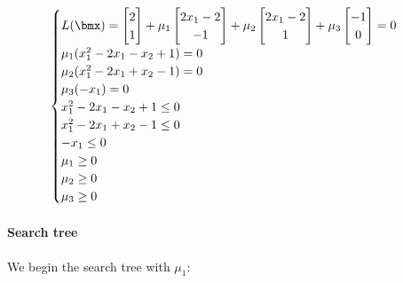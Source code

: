 \documentclass[\main/main.tex]{subfiles}
\begin{document}
\[
  \begin{cases}
    L(\bmx) = \begin{bmatrix}
      2 \\
      1
    \end{bmatrix} + \mu_1 \begin{bmatrix}
      2x_1 -2 \\
      -1
    \end{bmatrix} + \mu_2 \begin{bmatrix}
      2x_1 -2 \\
      1
    \end{bmatrix} + \mu_3 \begin{bmatrix}
      -1 \\
      0
    \end{bmatrix} = 0 \\
    \mu_1(x_1^2 - 2x_1 - x_2 + 1) = 0                                                                                                                 \\
    \mu_2(x_1^2 - 2x_1 + x_2 -1 ) = 0                                                                                                                 \\
    \mu_3(-x_1                  ) = 0                                                                                                                 \\
    x_1^2 - 2x_1 - x_2 + 1          \leq 0                                                                                                            \\
    x_1^2 - 2x_1 + x_2 -1           \leq 0                                                                                                            \\
    -x_1                            \leq 0                                                                                                            \\
    \mu_1 \geq 0                                                                                                                                      \\
    \mu_2 \geq 0                                                                                                                                      \\
    \mu_3 \geq 0
  \end{cases}
\]
\paragraph*{Search tree}
We begin the search tree with $\mu_1$:
\end{document}

